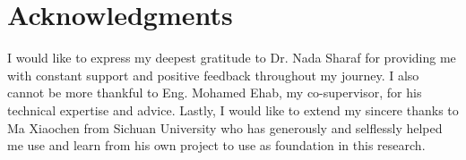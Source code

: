 \chapter*{Acknowledgments}
\label{chap:ack}

I would like to express my deepest gratitude to Dr. Nada Sharaf for providing me with constant support and positive feedback throughout my journey. I also cannot be more thankful to Eng. Mohamed Ehab, my co-supervisor, for his technical expertise and advice. Lastly, I would like to extend my sincere thanks to Ma Xiaochen from Sichuan University who has generously and selflessly helped me use and learn from his own project to use as foundation in this research.
